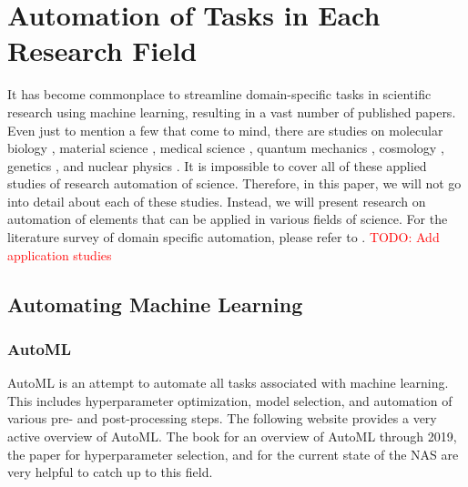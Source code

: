 
\section{Automation of Tasks in Each Research Field}

It has become commonplace to streamline domain-specific tasks in scientific research using machine learning, resulting in a vast number of published papers. Even just to mention a few that come to mind, there are studies on molecular biology \cite{jumper2021highly,senior2020improved}, material science \cite{ramprasad2017machine}, medical science \cite{vamathevan2019applications,shorten2021deep}, quantum mechanics \cite{carleo2017solving}, cosmology \cite{carleo2019machine}, genetics \cite{libbrecht2015machine}, and nuclear physics \cite{degrave2022magnetic}. It is impossible to cover all of these applied studies of research automation of science. Therefore, in this paper, we will not go into detail about each of these studies. Instead, we will present research on automation of elements that can be applied in various fields of science. For the literature survey of domain specific automation, please refer to \cite{xu2021artificial}. \textcolor{red}{TODO: Add application studies}

\subsection{Automating Machine Learning}

\subsubsection{AutoML}
AutoML is an attempt to automate all tasks associated with machine learning. This includes hyperparameter optimization, model selection, and automation of various pre- and post-processing steps. The following website \cite{automlorg} provides a very active overview of AutoML. The book \cite{hutter2019automated} for an overview of AutoML through 2019, the paper \cite{bischl2023hyperparameter} for hyperparameter selection, and \cite{lindauer2020best,white2023neural} for the current state of the NAS are very helpful to catch up to this field.

